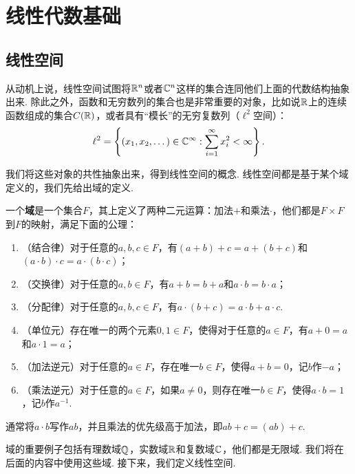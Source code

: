 \chapter{线性代数基础}\label{chap:linear-algebra}

\section{线性空间}

从动机上说，线性空间试图将$\mathbb{R}^n$或者$\mathbb{C}^n$这样的集合连同他们上面的代数结构抽象出来. 除此之外，函数和无穷数列的集合也是非常重要的对象，比如说$\mathbb{R}$上的连续函数组成的集合$C(\mathbb{R})$，或者具有“模长”的无穷复数列（$\ell^2$空间）：
\[\ell^2=\left\{(x_1,x_2,\dots)\in\mathbb{C}^\infty:\sum_{i=1}^\infty x_i^2<\infty\right\}.\]

我们将这些对象的共性抽象出来，得到线性空间的概念. 线性空间都是基于某个域定义的，我们先给出域的定义. 

\begin{definition}[域]
一个\textbf{域}是一个集合$F$，其上定义了两种二元运算：加法$+$和乘法$\cdot$，他们都是$F\times F$到$F$的映射，满足下面的公理：
\begin{enumerate}
    \item （结合律）对于任意的$a,b,c\in F$，有$(a+b)+c=a+(b+c)$和$(a\cdot b)\cdot c=a\cdot (b\cdot c)$；
    \item （交换律）对于任意的$a,b\in F$，有$a+b=b+a$和$a\cdot b=b\cdot a$；
    \item（分配律）对于任意的$a,b,c\in F$，有$a\cdot(b+c)=a\cdot b+a\cdot c$. 
    \item （单位元）存在唯一的两个元素$0,1\in F$，使得对于任意的$a\in F$，有$a+0=a$和$a\cdot 1=a$；
    \item （加法逆元）对于任意的$a\in F$，存在唯一$b\in F$，使得$a+b=0$，记$b$作$-a$；
    \item （乘法逆元）对于任意的$a\in F$，如果$a\neq 0$，则存在唯一$b\in F$，使得$a\cdot b=1$，记$b$作$a^{-1}$.
\end{enumerate}
通常将$a\cdot b$写作$ab$，并且乘法的优先级高于加法，即$ab+c=(ab)+c$. 
\end{definition}

域的重要例子包括有理数域$\mathbb{Q}$，实数域$\mathbb{R}$和复数域$\mathbb{C}$，他们都是无限域. 我们将在后面的内容中使用这些域. 接下来，我们定义线性空间. 

